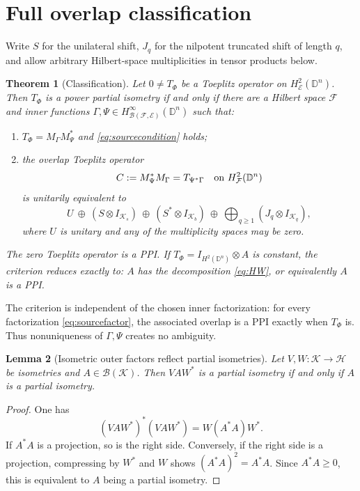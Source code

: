 \documentclass[11pt]{article}
\newtheorem{theorem}{Theorem}
\newtheorem{lemma}[theorem]{Lemma}
\newcommand{\D}{\mathbb D}
\newcommand{\B}{\mathcal B}
\begin{document}
\section{Full overlap classification}

Write $S$ for the unilateral shift, $J_q$ for the nilpotent truncated shift
of length $q$, and allow arbitrary Hilbert-space multiplicities in tensor
products below.

\begin{theorem}[Classification]\label{thm:classification}
Let $0\ne T_\Phi$ be a Toeplitz operator on
$H^2_{\mathcal E}(\D^n)$.  Then $T_\Phi$ is a power partial isometry if and
only if there are a Hilbert space $\mathcal F$ and inner functions
$\Gamma,\Psi\in H^\infty_{\B(\mathcal F,\mathcal E)}(\D^n)$ such that:
\begin{enumerate}
\item $T_\Phi=M_\Gamma M_\Psi^*$ and \eqref{eq:sourcecondition} holds;
\item the overlap Toeplitz operator
\begin{equation}\label{eq:overlap}
 C:=M_\Psi^*M_\Gamma=T_{\Psi^*\Gamma}
 \quad\hbox{on }H^2_{\mathcal F}(\D^n)
\end{equation}
is unitarily equivalent to
\begin{equation}\label{eq:HW}
 U\ \oplus\ (S\otimes I_{\mathcal K_s})\ \oplus\
 (S^*\otimes I_{\mathcal K_b})\ \oplus\
 \bigoplus_{q\geq1}(J_q\otimes I_{\mathcal K_q}),
\end{equation}
where $U$ is unitary and any of the multiplicity spaces may be zero.
\end{enumerate}
The zero Toeplitz operator is a PPI.  If $T_\Phi=I_{H^2(\D^n)}\otimes A$ is
constant, the criterion reduces exactly to: $A$ has the decomposition
\eqref{eq:HW}, or equivalently $A$ is a PPI.
\end{theorem}

The criterion is independent of the chosen inner factorization: for every
factorization \eqref{eq:sourcefactor}, the associated overlap is a PPI exactly
when $T_\Phi$ is.  Thus nonuniqueness of $\Gamma,\Psi$ creates no ambiguity.

\begin{lemma}[Isometric outer factors reflect partial isometries]
\label{lem:outer}
Let $V,W:\mathcal K\to\mathcal H$ be isometries and
$A\in\B(\mathcal K)$.  Then $VAW^*$ is a partial isometry if and only if
$A$ is a partial isometry.
\end{lemma}

\begin{proof}
One has
\[
 (VAW^*)^*(VAW^*)=W(A^*A)W^*.
\]
If $A^*A$ is a projection, so is the right side.  Conversely, if the right
side is a projection, compressing by $W^*$ and $W$ shows
$(A^*A)^2=A^*A$.  Since $A^*A\geq0$, this is equivalent to $A$ being a
partial isometry.
\end{proof}
\end{document}

